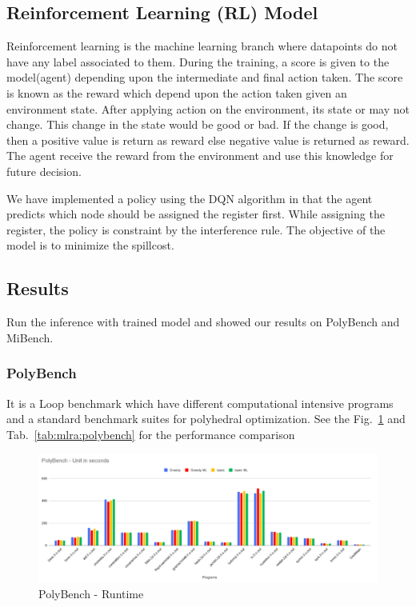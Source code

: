 \subsection{Reinforcement Learning (RL) Model}
Reinforcement learning is the machine learning branch where datapoints do not have any label associated to them. During the training, a score is given to the model(agent) depending upon the intermediate and final action taken. The score is known as the reward which depend upon the action taken given an environment state. After applying action on the environment, its state or may not change. This change in the state would be good or bad. If the change is good, then a positive value is return as reward else negative value is returned as reward. The agent receive the reward from the environment and use this knowledge for future decision.

We have implemented a policy using the DQN algorithm in that the agent predicts which node should be assigned the register first.  While assigning the register, the policy is constraint by the interference rule. The objective of the model is to minimize the spillcost.

\subsection{Results}

Run the inference with trained model and showed our results on PolyBench and MiBench\cite{mibench}.
\subsubsection{PolyBench}
It is a Loop benchmark which have different computational intensive programs and a standard benchmark suites for polyhedral optimization. See the Fig.~\ref{fig:mlra-polybench} and Tab.~\ref{tab:mlra:polybench} for the performance comparison

\begin{figure}[h!]
    \centering
    \includegraphics[scale=0.4]{figures/chapter-5/polybench.png}
    \caption{PolyBench - Runtime}
     \label{fig:mlra-polybench}
\end{figure}


